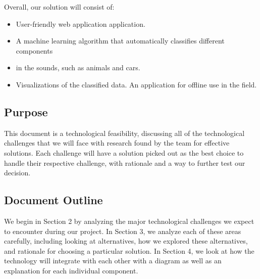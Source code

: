\documentclass[12pt,journal,compsoc]{IEEEtran}
\newenvironment{subs}
  {\adjustwidth{1em}{0pt}}
  {\endadjustwidth}
\begin{document}
\begin{subs}
\skippingparagraph Overall, our solution will consist of:
\begin{subs}
\begin{itemize}
    \item User-friendly web application application.
    \item A machine learning algorithm that automatically classifies different components \item in the sounds, such as animals and cars.
    \item Visualizations of the classified data.
    \itme An application for offline use in the field.
\end{itemize}
\end{subs}


\subsection{Purpose}
This document is a technological feasibility, discussing all of the technological challenges that we will face with research found by the team for effective solutions. Each challenge will have a solution picked out as the best choice to handle their respective challenge, with rationale and a way to further test our decision.

\subsection{Document Outline}
We begin in Section 2 by analyzing the major technological challenges we expect to encounter during our project. In Section 3, we analyze each of these areas carefully, including looking at alternatives, how we explored these alternatives, and rationale for choosing a particular solution. In Section 4, we look at how the technology will integrate with each other with a diagram as well as an explanation for each individual component.

\end{subs}
\end{document}
